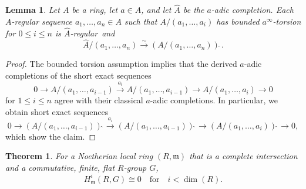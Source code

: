 \documentclass[11pt, reqno]{amsart}
\newcommand{\isomto}{\overset{\sim}{\longrightarrow}}
\newcommand{\ra}{\rightarrow}
\newcommand{\wh}{\widehat}
\newcommand{\xra}{\xrightarrow}
\newcommand{\blem}{\begin{lemma}}
\newcommand{\elem}{\end{lemma}}
\providecommand{\qxq}[1]{\quad\text{#1}\quad}
\newcommand{\bpf}{\begin{proof}}
\newcommand{\epf}{\end{proof}}
\numberwithin{equation}{numberingbase}
\theoremstyle{thms}
\newtheorem{lemma}[numberingbase]{Lemma}
\newtheorem{theorem}[numberingbase]{Theorem}
\theoremstyle{claims}
\theoremstyle{defs}
\theoremstyle{thms}
\theoremstyle{defs}
\theoremstyle{subsection-tweak}
\theoremstyle{subsection-tweak}
\begin{document}
\blem \label{slip-in-complete}
Let $A$ be a ring, let $a \in A$, and let $\wh{A}$ be the $a$-adic completion. Each $A$-regular sequence $a_1, \dotsc, a_n \in A$ such that $A/(a_1, \dotsc, a_i)$ has bounded $a^\infty$-torsion for $0 \le i \le n$ is $\wh{A}$-regular~and
\[
\wh{A}/(a_1, \dotsc, a_n) \isomto (A/(a_1, \dotsc, a_n))\wh{\ }.
\]
\elem

\bpf
The bounded torsion assumption implies that the derived $a$-adic completions of the short exact sequences 
\[
0 \ra A/(a_1, \dotsc, a_{i - 1}) \xra{a_i}  A/(a_1, \dotsc, a_{i - 1}) \ra  A/(a_1, \dotsc, a_{i}) \ra 0 
\]
for $1 \le i \le n$ agree with their classical $a$-adic completions. In particular, we obtain short exact sequences 
\[
0 \ra (A/(a_1, \dotsc, a_{i - 1}))\wh{\ } \xra{a_i}  (A/(a_1, \dotsc, a_{i - 1}))\wh{\ } \ra  (A/(a_1, \dotsc, a_{i}))\wh{\ } \ra 0,
\]
which show the claim.
\epf




\begin{theorem} \label{main-pf}
For a Noetherian local ring $(R,\mathfrak m)$ that is a complete intersection and a commutative, finite, flat $R$-group $G$,
\[
H^i_{\mathfrak m}(R,G) \cong 0 \qxq{for} i < \dim(R).
\]
\end{theorem}
\end{document}
